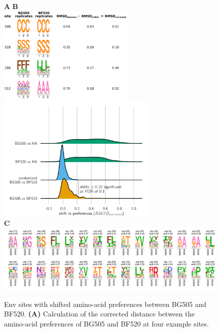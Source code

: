 \documentclass[9pt]{elife}
\begin{document}
\begin{figure}
\begin{fullwidth}
{\bf \Large A} \hspace{0.61\textwidth} {\bf \Large B} \\
\hspace{0.01\textwidth} 
\includegraphics[width=0.58\textwidth]{figures/prefs_distance/prefs_distance.pdf}
\hspace{0.03\textwidth}
\includegraphics[clip=true, trim=0in 0in 0in 1.2in, width=0.68\textwidth]{figures/distance_distribution.pdf}
\vspace{0.15in}
\\ 
{\bf \Large C} \\
\includegraphics[width=1.3\textwidth]{figures/shifted_sites.pdf}
\caption{\label{fig:prefsdist}
Env sites with shifted amino-acid preferences between BG505 and BF520.
{\bf (A)} Calculation of the corrected distance between the amino-acid preferences of BG505 and BF520 at four example sites.
}
\end{fullwidth}
\end{figure}
\end{document}
